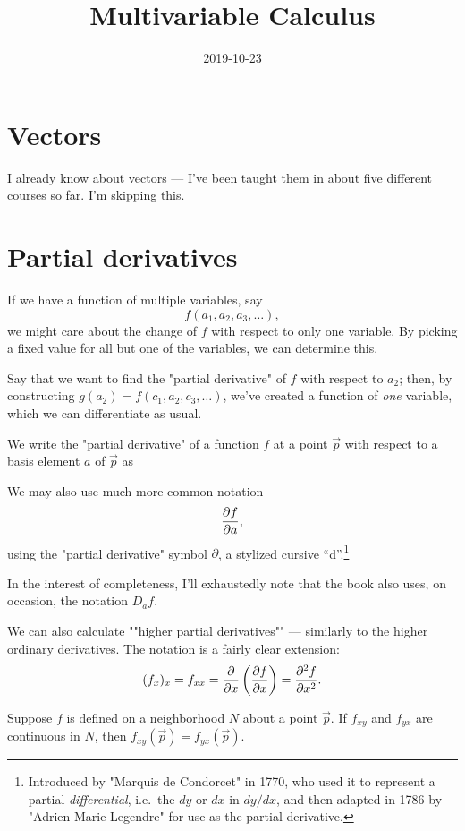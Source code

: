 \documentclass[knowledge]{rbt-mathnotes}
\title{Multivariable Calculus}
\date{2019-10-23}
\begin{document}
\maketitle
\tableofcontents

\chapter{Vectors}
I already know about vectors --- I've been taught them in about five
different courses so far. I'm skipping this.

\chapter{Partial derivatives}

If we have a function of multiple variables, say
\[f(a_1, a_2, a_3, \dots),\]
we might care about the change of $f$ with respect to only one variable. By
picking a fixed value for all but one of the variables, we can determine
this.

Say that we want to find the "partial derivative" of $f$ with respect to
$a_2$; then, by constructing $g(a_2) = f(c_1, a_2, c_3, \dots)$, we've
created a function of \emph{one} variable, which we can differentiate as
usual.
\begin{notation}
  We write the "partial derivative" of a function $f$ at a point $\vec p$ 
  with respect to a basis element $a$ of $\vec p$ as 

  We may also use much more common notation
  \[\pd[f]{a},\]
  using the "partial derivative" symbol $\partial$, a stylized cursive
  ``d''.\footnote{Introduced by "Marquis de Condorcet" in 1770, who used it
  to represent a partial \emph{differential}, i.e.~the $dy$ or $dx$ in
  $dy/dx$, and then adapted in 1786 by "Adrien-Marie Legendre" for use as the
  partial derivative.}

  In the interest of completeness, I'll exhaustedly note that the book also
  uses, on occasion, the notation $D_a f$.
\end{notation}

We can also calculate ""higher partial derivatives"" --- similarly to the
higher ordinary derivatives. The notation is a fairly clear extension:
\[(f_x)_x = f_{xx} = \pd x \left( \pd[f]{x} \right) = \pd[^2 f]{x^2}.\]

\begin{thm}
  Suppose $f$ is defined on a neighborhood $N$ about a point $\vec p$.
  If $f_{xy}$ and $f_{yx}$ are continuous in $N$, then $f_{xy}(\vec p) =
  f_{yx}(\vec p)$.
\end{thm}
\end{document}
